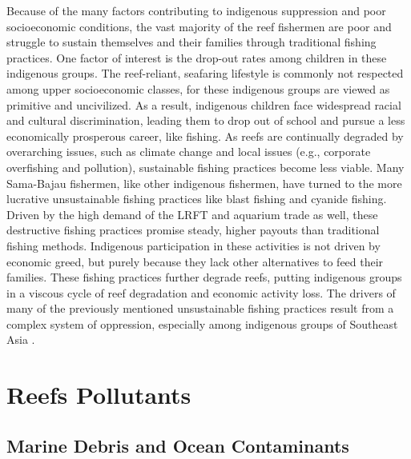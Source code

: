 \documentclass{book}\usepackage{knitr}
\begin{document}
\begin{knitrout}
\begin{kframe}
Because of the many factors contributing to indigenous suppression and poor socioeconomic conditions, the vast majority of the reef fishermen are poor and struggle to sustain themselves and their families through traditional fishing practices. One factor of interest is the drop-out rates among children in these indigenous groups. The reef-reliant, seafaring lifestyle is commonly not respected among upper socioeconomic classes, for these indigenous groups are viewed as primitive and uncivilized. As a result, indigenous children face widespread racial and cultural discrimination, leading them to drop out of school and pursue a less economically prosperous career, like fishing. As reefs are continually degraded by overarching issues, such as climate change and local issues (e.g., corporate overfishing and pollution), sustainable fishing practices become less viable. Many Sama-Bajau fishermen, like other indigenous fishermen, have turned to the more lucrative unsustainable fishing practices like blast fishing and cyanide fishing. Driven by the high demand of the LRFT and aquarium trade as well, these destructive fishing practices promise steady, higher payouts than traditional fishing methods. Indigenous participation in these activities is not driven by economic greed, but purely because they lack other alternatives to feed their families. These fishing practices further degrade reefs, putting indigenous groups in a viscous cycle of reef degradation and economic activity loss. The drivers of many of the previously mentioned unsustainable fishing practices result from a complex system of oppression, especially among indigenous groups of Southeast Asia \citep{boatpeople}.

\section{Reefs Pollutants}

\subsection{Marine Debris and Ocean Contaminants} \label{sub:mdoc}


\end{kframe}
\end{knitrout}
\end{document}
